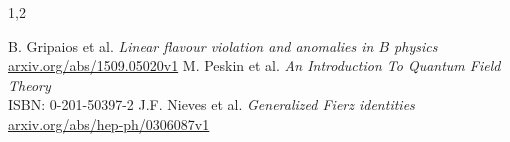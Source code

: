 \documentclass[11pt,a4paper,twoside]{article}
\begin{document}
\begin{spacing}{1,2}
% 
% 
% 
% 
% 
\end{spacing}
\newpage

\begin{thebibliography}{xxx}
 B. Gripaios et al. \textit{Linear flavour violation and anomalies in $B$ physics}\\ \href{http://arxiv.org/abs/1509.05020v1}{arxiv.org/abs/1509.05020v1}
 M. Peskin et al. \textit{An Introduction To Quantum Field Theory}\\ ISBN: 0-201-50397-2
 J.F. Nieves et al. \textit{Generalized Fierz identities}\\ \href{http://http://arxiv.org/abs/hep-ph/0306087v1}{arxiv.org/abs/hep-ph/0306087v1}
\end{thebibliography}
\end{document}

